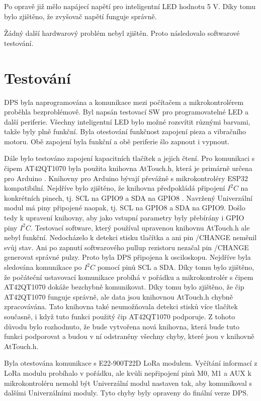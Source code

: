Po opravě již mělo napájecí napětí pro inteligentní LED hodnotu 5 V. Díky tomu bylo zjištěno, že zvyšovač napětí funguje správně. 

Žádný další hardwarový problém nebyl zjištěn. Proto následovalo softwarové testování. 

\section{Testování}
DPS byla naprogramována a komunikace mezi počítačem a mikrokontrolérem proběhla bezproblémově. Byl napsán testovací SW pro programovatelné LED 
a další periferie. Všechny inteligentní LED bylo možné rozsvítit různými barvami, takže byly plně funkční. Byla otestování funkčnost 
zapojení pieza a vibračního motoru. Obě zapojení byla funkční a obě periferie šlo zapnout i vypnout. 

Dále bylo testováno zapojení kapacitních tlačítek a jejich čtení. Pro komunikaci s čipem AT42QT1070 byla použita knihovna AtTouch.h, která je primárně určena pro Arduino \cite{AtTouch}. 
Knihovny pro Arduino bývají převážně s mikrokontroléry ESP32 kompatibilní. Nejdříve bylo zjištěno, že knihovna předpokládá připojení $I^2C$ na konkrétních pinech, tj. SCL na GPIO9 a SDA 
na GPIO8 \cite{AtTouch}. Navržený Univerzální modul má piny připojené naopak, tj. SCL na GPIO8 a SDA na GPIO9. Došlo tedy k upravení knihovny, aby jako vstupní parametry byly přebírány i GPIO 
piny $I^2C$. Testovací software, který používal upravenou knihovnu AtTouch.h ale nebyl funkční. Nedocházelo k detekci stisku tlačítka a ani pin /CHANGE neměnil svůj stav. Ani po zapnutí 
softwarového pullup rezistoru nezačal pin /CHANGE generovat správné pulzy. Proto byla DPS 
připojena k osciloskopu. Nejdříve byla sledována komunikace po $I^2C$ pomocí pinů SCL a SDA. Díky tomu bylo zjištěno, že počáteční ustavovací komunikace probíhá v pořádku a mikrokontrolér 
s čipem AT42QT1070 dokáže bezchybně komunikovat. Díky tomu bylo zjištěno, že čip AT42QT1070 funguje správně, ale data jsou knihovnou AtTouch.h chybně zpracovávána. Tato knihovna také neumožňovala detekci 
stisků více tlačítek současně, i když tuto funkci použitý čip AT42QT1070 podporuje. Z tohoto důvodu bylo rozhodnuto, že bude vytvořena nová knihovna, která bude tuto funkci podporovat 
a budou v ní odstraněny všechny chyby, které jsou v knihovně AtTouch.h. 

Byla otestována komunikace s E22-900T22D LoRa modulem. Vyčítání informací z LoRa modulu probíhalo v pořádku, ale kvůli nepřipojení pinů M0, M1 a AUX k mikrokontroléru nemohl být Univerzální modul 
nastaven tak, aby komunikoval s dalšími Univerzálními moduly. Tyto chyby byly opraveny do finální verze DPS.

